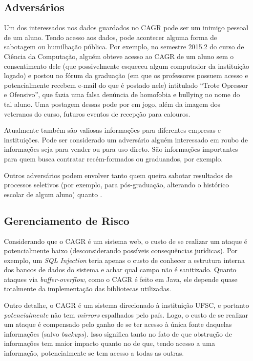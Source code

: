 \documentclass{article}
\newcommand{\todo}[1]{{\color{red}{#1}}}
\begin{document}
    \subsection{Adversários}

    Um dos interessados nos dados guardados no CAGR pode ser um inimigo pessoal
    de um aluno. Tendo acesso aos dados, pode acontecer alguma forma de
    sabotagem ou humilhação pública. Por exemplo, no semestre 2015.2 do curso
    de Ciência da Computação, alguém obteve acesso ao CAGR de um aluno sem o
    consentimento dele (que possivelmente esqueceu algum computador da
    instituição logado) e postou no fórum da graduação (em que os professores
    possuem acesso e potencialmente recebem e-mail do que é postado nele)
    intitulado ``Trote Opressor e Ofensivo'', que fazia uma falsa denúncia de
    homofobia e bullying no nome do tal aluno. Uma postagem dessas pode por em
    jogo, além da imagem dos veteranos do curso, futuros eventos de recepção
    para calouros.

    Atualmente também são valiosas informações para diferentes empresas e
    instituições. Pode ser considerado um adversário alguém interessado em
    roubo de informações seja para vender ou para uso direto. São informações
    importantes para quem busca contratar recém-formados ou graduandos, por
    exemplo.

    Outros adversários podem envolver tanto quem queira sabotar resultados de
    processos seletivos (por exemplo, para pós-graduação, alterando o histórico
    escolar de algum aluno) quanto \todo{quem mesmo?}.

    \subsection{Gerenciamento de Risco}

    Considerando que o CAGR é um sistema web, o custo de se realizar um ataque
    é potencialmente baixo (desconsiderando possíveis consequências jurídicas).
    Por exemplo, um \textit{SQL Injection} teria apenas o custo de conhecer a
    estrutura interna dos bancos de dados do sistema e achar qual campo não é
    sanitizado. Quanto ataques via \textit{buffer-overflow}, como o CAGR é
    feito em Java, ele depende quase totalmente da implementação das
    bibliotecas utilizadas.

    Outro detalhe, o CAGR é um sistema direcionado à instituição UFSC, e
    portanto \emph{potencialmente} não tem \textit{mirrors} espalhados pelo
    país. Logo, o custo de se realizar um ataque é compensado pelo ganho de se
    ter acesso à única fonte daquelas informações (salvo \textit{backups}).
    Isso significa tanto no fato de que obstrução de informações tem maior
    impacto quanto no de que, tendo acesso a uma informação, potencialmente se
    tem acesso a todas as outras.
\end{document}
